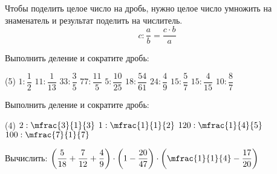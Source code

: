 \begin{class}[number=2]
\begin{definit}
			Чтобы поделить целое число на дробь, нужно целое число умножить на знаменатель и результат поделить на числитель.
			\[ c:\dfrac{a}{b}=\dfrac{c\cdot b}{a} \]
		\end{definit}
	\begin{listofex}[resume]
			\item Выполнить деление и сократите дробь:
			\begin{tasks}(5)
				\task \( 1:\dfrac{1}{2} \)
				\task \( 11:\dfrac{1}{13} \)
				\task \( 33:\dfrac{3}{5} \)
				\task \( 77:\dfrac{11}{5} \)
				\task \( 5:\dfrac{10}{25} \)
				\task \( 18:\dfrac{54}{61} \)
				\task \( 24:\dfrac{4}{9} \)
				\task \( 15:\dfrac{5}{7} \)
				\task \( 15:\dfrac{4}{15} \)
				\task \( 10:\dfrac{8}{7} \)
			\end{tasks}
			\item Выполнить деление и сократите дробь:
		\begin{tasks}(4)
			\task \( 2:\mfrac{3}{1}{3} \)
			\task \( 1:\mfrac{1}{1}{2} \)
			\task \( 120:\mfrac{1}{4}{5} \)
			\task \( 100:\mfrac{7}{1}{7} \)
		\end{tasks}
	\item Вычислить: \( \left( \dfrac{5}{18}+\dfrac{7}{12}+\dfrac{4}{9} \right)\cdot\left( 1-\dfrac{20}{47} \right)\cdot\left( \mfrac{1}{1}{4}-\dfrac{17}{20} \right) \)
	\end{listofex}
	

\end{class}
%
%
